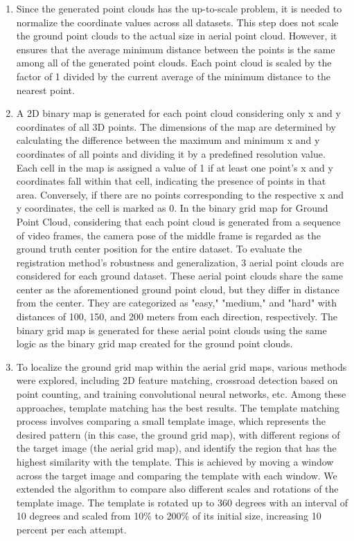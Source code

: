 \documentclass[11pt]{article}
\begin{document}
\begin{enumerate}
        \item Since the generated point clouds has the up-to-scale problem, it is needed to normalize the
        coordinate values across all datasets. This step does not scale the ground point clouds to the actual size
        in aerial point cloud. However, it ensures that the average minimum distance between the points is the same
        among all of the generated point clouds.
        Each point cloud is scaled by the factor of 1 divided by the current average of the minimum distance to the nearest point.

        \item A 2D binary map is generated for each point cloud considering only x and y coordinates of all 3D points.
        The dimensions of the map are determined by calculating the difference between the maximum and minimum x and y
        coordinates of all points and dividing it by a predefined resolution value. Each cell in the map is assigned
        a value of 1 if at least one point's x and y coordinates fall within that cell, indicating the presence of
        points in that area. Conversely, if there are no points corresponding to the respective x and y coordinates,
        the cell is marked as 0. In the binary grid map for Ground Point Cloud, considering that each point cloud is
        generated from a sequence of video frames, the camera pose of the middle frame is regarded as the ground truth
        center position for the entire dataset. To evaluate the registration method's robustness and generalization,
        3 aerial point clouds are considered for each ground dataset. These aerial point clouds share the same center
        as the aforementioned ground point cloud, but they differ in distance from the center. They are categorized
        as "easy," "medium," and "hard" with distances of 100, 150, and 200 meters from each direction, respectively.
        The binary grid map is generated for these aerial point clouds using the same logic as the binary grid map
        created for the ground point clouds.

        \item To localize the ground grid map within the aerial grid maps, various methods were explored, including
        2D feature matching, crossroad detection based on point counting, and training convolutional neural networks,
        etc. Among these approaches, template matching has the best results. The template matching process involves
        comparing a small template image, which represents the desired pattern (in this case, the ground grid map),
        with different regions of the target image (the aerial grid map), and identify the region that has the highest
        similarity with the template. This is achieved by moving a window across the target
        image and comparing the template with each window. We extended the algorithm to compare also different
        scales and rotations of the template image. The template is rotated up to 360 degrees with an interval of 10 degrees and
        scaled from 10\% to 200\% of its initial size, increasing 10 percent per each attempt.

    \end{enumerate}
\end{document}
